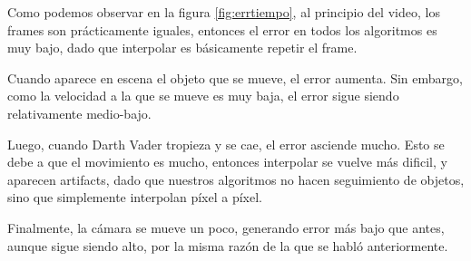 Como podemos observar en la figura \ref{fig:errtiempo}, al principio del video, los frames son prácticamente iguales, entonces el error en todos los algoritmos es muy bajo, dado que interpolar es básicamente repetir el frame.

Cuando aparece en escena el objeto que se mueve, el error aumenta. Sin embargo, como la velocidad a la que se mueve es muy baja, el error sigue siendo relativamente medio-bajo. 

Luego, cuando Darth Vader tropieza y se cae, el error asciende mucho. Esto se debe a que el movimiento es mucho, entonces interpolar se vuelve más dificil, y aparecen artifacts, dado que nuestros algoritmos no hacen seguimiento de objetos, sino que simplemente interpolan píxel a píxel.

Finalmente, la cámara se mueve un poco, generando error más bajo que antes, aunque sigue siendo alto, por la misma razón de la que se habló anteriormente.



